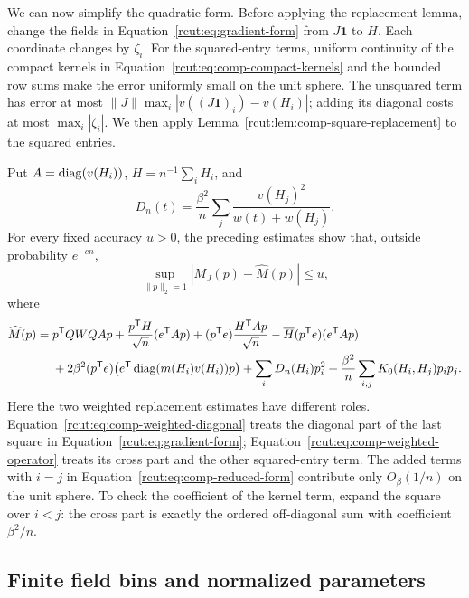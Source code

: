 We can now simplify the quadratic form.  Before applying the replacement
lemma, change the fields in Equation~\eqref{rcut:eq:gradient-form} from
$J\boldsymbol1$ to $H$.  Each coordinate changes by $\zeta_i$.
For the squared-entry terms, uniform continuity of the compact kernels
in Equation~\eqref{rcut:eq:comp-compact-kernels} and the bounded row sums
make the error uniformly small on the unit sphere.  The unsquared term
has error at most
$\|J\|\max_i|v((J\boldsymbol1)_i)-v(H_i)|$; adding its diagonal
costs at most $\max_i|\zeta_i|$.  We then apply
Lemma~\ref{rcut:lem:comp-square-replacement} to the squared entries.

Put $A=\operatorname{diag}(v(H_i))$, $\overline H=n^{-1}\sum_iH_i$, and
\[
 D_n(t)=\frac{\beta^2}{n}\sum_j
       \frac{v(H_j)^2}{w(t)+w(H_j)}.
\]
For every fixed accuracy $u>0$, the preceding estimates show that,
outside probability $e^{-cn}$,
\begin{equation}
 \sup_{\|p\|_2=1}|M_J(p)-\widehat M(p)|\le u,
 \label{rcut:eq:comp-reduced-error}
\end{equation}
where
\begin{align}
 \widehat M(p)={}&p^{\mathsf T}QWQAp
 +\frac{p^{\mathsf T}H}{\sqrt n}(e^{\mathsf T}Ap)
 +(p^{\mathsf T}e)\frac{H^{\mathsf T}Ap}{\sqrt n}
 -\overline H(p^{\mathsf T}e)(e^{\mathsf T}Ap)\notag\\
 &+2\beta^2(p^{\mathsf T}e)
       \bigl(e^{\mathsf T}\operatorname{diag}(m(H_i)v(H_i))p\bigr)
 +\sum_iD_n(H_i)p_i^2
 +\frac{\beta^2}{n}\sum_{i,j}K_0(H_i,H_j)p_ip_j.
 \label{rcut:eq:comp-reduced-form}
\end{align}
Here the two weighted replacement estimates have different roles.
Equation~\eqref{rcut:eq:comp-weighted-diagonal} treats the diagonal part
of the last square in Equation~\eqref{rcut:eq:gradient-form};
Equation~\eqref{rcut:eq:comp-weighted-operator} treats its cross part
and the other squared-entry term.  The added terms with $i=j$ in
Equation~\eqref{rcut:eq:comp-reduced-form} contribute only
$O_\beta(1/n)$ on the unit sphere.  To check the coefficient of the
kernel term, expand the square over $i<j$: the cross part is exactly
the ordered off-diagonal sum with coefficient $\beta^2/n$.

\subsection{Finite field bins and normalized parameters}

